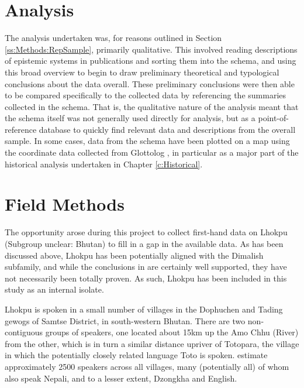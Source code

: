 \section{Analysis}
The analysis undertaken was, for reasons outlined in Section \ref{ss:Methods:RepSample}, primarily qualitative. This involved reading descriptions of epistemic systems in publications and sorting them into the schema, and using this broad overview to begin to draw preliminary theoretical and typological conclusions about the data overall. These preliminary conclusions were then able to be compared specifically to the collected data by referencing the summaries collected in the schema. That is, the qualitative nature of the analysis meant that the schema itself was not generally used directly for analysis, but as a point-of-reference database to quickly find relevant data and descriptions from the overall sample. In some cases, data from the schema have been plotted on a map using the coordinate data collected from Glottolog \cite{glottolog}, in particular as a major part of the historical analysis undertaken in Chapter \ref{c:Historical}.

\section{Field Methods}\label{s:Methods:FieldMethods}
The opportunity arose during this project to collect first-hand data on Lhokpu (Subgroup unclear: Bhutan) to fill in a gap in the available data. As has been discussed above, Lhokpu has been potentially aligned with the Dimalish subfamily, and while the conclusions in  are certainly well supported, they have not necessarily been totally proven. As such, Lhokpu has been included in this study as an internal isolate.

Lhokpu is spoken in a small number of villages in the Dophuchen and Tading gewogs of Samtse District, in  south-western Bhutan. There are two non-contiguous groups of speakers, one located about 15km up the Amo Chhu (River) from the other, which is in turn a similar distance upriver of Totopara, the village in which the potentially closely related language Toto is spoken.  estimate approximately 2500 speakers across all villages, many (potentially all) of whom also speak Nepali, and to a lesser extent, Dzongkha and English.

